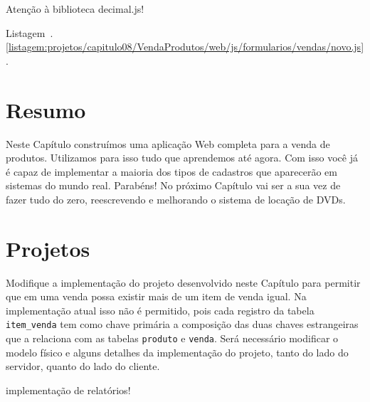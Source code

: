 Atenção à biblioteca decimal.js! 

Listagem~\thechapter.\ref{listagem:projetos/capitulo08/VendaProdutos/web/js/formularios/vendas/novo.js}.



\section{Resumo}

Neste Capítulo construímos uma aplicação Web completa para a venda de produtos. Utilizamos para isso tudo que aprendemos até agora. Com isso você já é capaz de implementar a maioria dos tipos de cadastros que aparecerão em sistemas do mundo real. Parabéns! No próximo Capítulo vai ser a sua vez de fazer tudo do zero, reescrevendo e melhorando o sistema de locação de DVDs. 


\section{Projetos}

\begin{projetoSemArquivo}{}{}{}
    Modifique a implementação do projeto desenvolvido neste Capítulo para permitir que em uma venda possa existir mais de um item de venda igual. Na implementação atual isso não é permitido, pois cada registro da tabela \texttt{item\_venda} tem como chave primária a composição das duas chaves estrangeiras que a relaciona com as tabelas \texttt{produto} e \texttt{venda}. Será necessário modificar o modelo físico e alguns detalhes da implementação do projeto, tanto do lado do servidor, quanto do lado do cliente.
\end{projetoSemArquivo}

implementação de relatórios!
